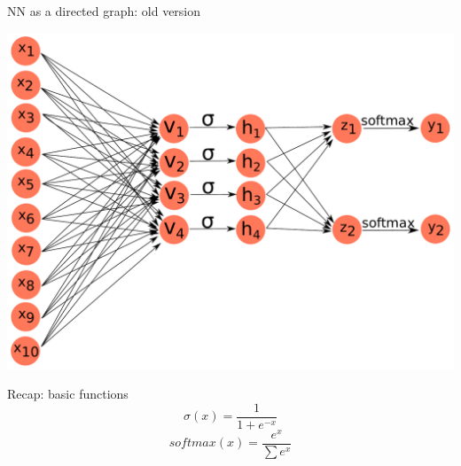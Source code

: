 \documentclass[10pt]{beamer}
\begin{document}
\begin{frame}[fragile]{NN as a directed graph: old version}
\begin{center}
\includegraphics[scale=0.44]{images/OldNN2.pdf}
\end{center}
\end{frame}

\begin{frame}{Recap: basic functions}
\Large{
 \vspace{0.2cm}
\begin{equation*}
\sigma(x) = \frac{1}{1 + e^{-x}}
\end{equation*}
\vspace{0.5cm}
 \begin{equation*}
softmax(x) = \frac{e^{x}}{\sum e^{x}}
\end{equation*}
}
\end{frame}
\end{document}
